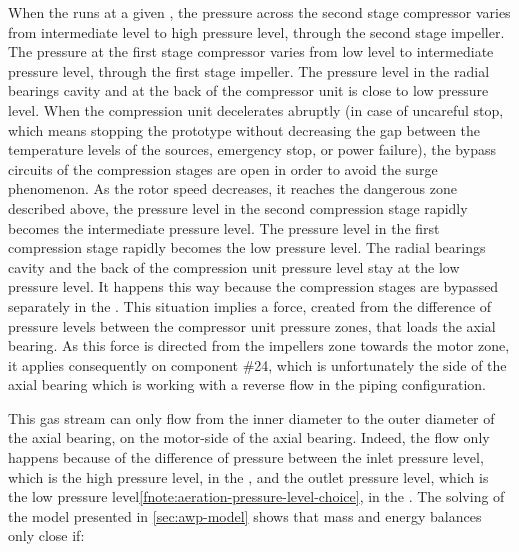 When the \AWP{} runs at a given \OP{}, the pressure across the second
stage compressor varies from intermediate level to high pressure
level, through the second stage impeller. The pressure at the first
stage compressor varies from low level to intermediate pressure level,
through the first stage impeller. The pressure level in the radial
bearings cavity and at the back of the compressor unit is close to low
pressure level. When the compression unit decelerates abruptly (in
case of uncareful stop, which means stopping the prototype without
decreasing the gap between the temperature levels of the sources,
emergency stop, or power failure), the bypass circuits of the
compression stages are open in order to avoid the surge
phenomenon. As the rotor speed decreases, it reaches the dangerous
zone described above, the pressure level in the second compression
stage rapidly becomes the intermediate pressure level. The pressure
level in the first compression stage rapidly becomes the low pressure
level. The radial bearings cavity and the back of the compression unit
pressure level stay at the low pressure level. It happens this way
because the compression stages are bypassed separately in the
\AWP{}. This situation implies a force, created from
the difference of pressure levels between the compressor unit pressure
zones, that loads the axial bearing. As this force is directed from
the impellers zone towards the motor zone, it applies consequently on
component \#24, which is unfortunately the side of the axial bearing
which is working with a reverse flow in the \AWP{} piping
configuration.

This gas stream can only flow from the inner diameter to the outer
diameter of the axial bearing, on the motor-side of the axial
bearing. Indeed, the flow only happens because of the difference of
pressure between the inlet pressure level, which is the high pressure
level, in the \AWP{},
and the outlet pressure level, which is the low pressure
level\cref{fnote:aeration-pressure-level-choice}, in the \AWP{}. The
solving of the model presented in \cref{sec:awp-model} shows that mass
and energy balances only close if:

